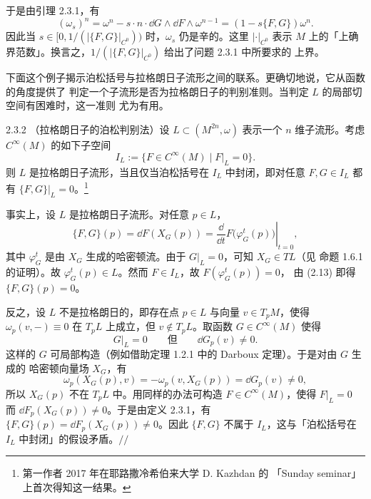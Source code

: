 于是由引理 2.3.1，有
\[
  (\omega_s)^n=\omega^n-s\cdot n\cdot\dd G\wedge\dd F\wedge\omega^{n-1}
  =(1-s\{F,G\})\omega^n .
\]
因此当 $s\in[0,1/(|\{F,G\}|_{C^0}))$ 时，$\omega_s$ 仍是辛的。这里 $|\cdot|_{C^0}$ 表示
$M$ 上的「上确界范数」。换言之，$1/(|\{F,G\}|_{C^0})$ 给出了问题 2.3.1 中所要求的
上界。

下面这个例子揭示泊松括号与拉格朗日子流形之间的联系。更确切地说，它从函数的角度提供了
判定一个子流形是否为拉格朗日子的判别准则。当判定 $L$ 的局部切空间有困难时，这一准则
尤为有用。

\begin{wexam}{2.3.2}
（拉格朗日子的泊松判别法）设 $L\subset(M^{2n},\omega)$ 表示一个 $n$ 维子流形。考虑
$C^\infty(M)$ 的如下子空间
\[
  I_L:=\{F\in C^\infty(M)\mid F|_L=0\}.
\]
则 $L$ 是拉格朗日子流形，当且仅当泊松括号在 $I_L$ 中封闭，即对任意 $F,G\in I_L$ 都有
$\{F,G\}|_L=0$。\footnote{第一作者 2017 年在耶路撒冷希伯来大学 D. Kazhdan 的
「Sunday seminar」上首次得知这一结果。}

事实上，设 $L$ 是拉格朗日子流形。对任意 $p\in L$，
\begin{equation}
  \{F,G\}(p)=\dd F(X_G(p))
  =\left.\frac{\dd}{\dd t}F\big(\varphi_G^t(p)\big)\right|_{t=0},
  \tag{2.13}
\end{equation}
其中 $\varphi_G^t$ 是由 $X_G$ 生成的哈密顿流。由于 $G|_L=0$，可知 $X_G\in TL$（见
命题 1.6.1 的证明）。故 $\varphi_G^t(p)\in L$。然而 $F\in I_L$，故 $F(\varphi_G^t(p))=0$，
由 (2.13) 即得 $\{F,G\}(p)=0$。

反之，设 $L$ 不是拉格朗日的，即存在点 $p\in L$ 与向量 $v\in T_pM$，使得
$\omega_p(v,-)\equiv0$ 在 $T_pL$ 上成立，但 $v\notin T_pL$。取函数 $G\in C^\infty(M)$
使得
\[
  G|_L=0\qquad\text{但}\qquad \dd G_p(v)\neq0 .
\]
这样的 $G$ 可局部构造（例如借助定理 1.2.1 中的 Darboux 定理）。于是对由 $G$ 生成的
哈密顿向量场 $X_G$，有
\[
  \omega_p(X_G(p),v)=-\omega_p(v,X_G(p))=\dd G_p(v)\neq0,
\]
所以 $X_G(p)$ 不在 $T_pL$ 中。用同样的办法可构造 $F\in C^\infty(M)$，使得 $F|_L=0$
而 $\dd F_p(X_G(p))\neq0$。于是由定义 2.3.1，有
$\{F,G\}(p)=\dd F_p(X_G(p))\neq0$。因此 $\{F,G\}$ 不属于 $I_L$，这与「泊松括号在
$I_L$ 中封闭」的假设矛盾。\hfill$//$
\end{wexam}

